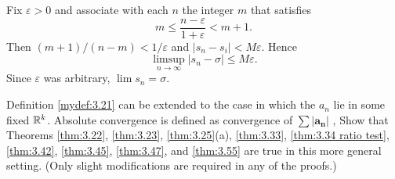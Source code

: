 \begin{myExercise}
\begin{asparaenum}[(a)]
        Fix $\varepsilon > 0$ and associate with each $n$ the integer $m$ that satisfies
        \begin{equation*}
            m \leq \frac{n - \varepsilon}{1 + \varepsilon}
            < m+1 .
        \end{equation*}
        Then $(m + 1)/(n - m) < 1/\varepsilon$ and $\left| s_n-s_i \right| < M\varepsilon$. Hence
        \begin{equation*}
            \limsup_{n \to \infty} \left| s_n - \sigma \right| \leq M \varepsilon .
        \end{equation*}
        Since $\varepsilon$ was arbitrary, $\lim s_n = \sigma$.
    \end{asparaenum}
\end{myExercise}

\begin{myExercise}
    \label{ex:3.15}
    Definition \ref{mydef:3.21} can be extended to the case
    in which the $a_n$ lie in some fixed ${\protect\mathbb R}^k$.
    Absolute convergence is defined as convergence of $\sum \left| \mathbf{a_n} \right|$ , 
    Show that Theorems \ref{thm:3.22}, \ref{thm:3.23}, \ref{thm:3.25}(a), \ref{thm:3.33}, \ref{thm:3.34 ratio test}, \ref{thm:3.42}, \ref{thm:3.45}, \ref{thm:3.47}, and \ref{thm:3.55} are true in this more general setting. 
    (Only slight modifications are required in any of the proofs.)
\end{myExercise}

